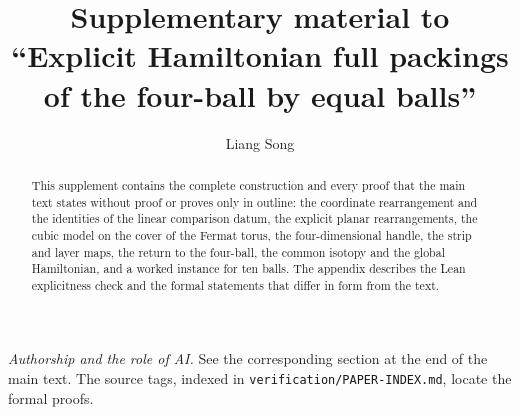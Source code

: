 \documentclass[11pt]{amsart}
\title[Supplement: Hamiltonian packings of the four-ball]{Supplementary material to\\
``Explicit Hamiltonian full packings of the four-ball by equal balls''}
\author{Liang Song}
\date{}
\begin{document}
\begin{abstract}
This supplement contains the complete construction and every proof that the main text states without proof or
proves only in outline: the coordinate rearrangement and the identities of the linear comparison datum, the explicit
planar rearrangements, the cubic model on the cover of the Fermat torus, the four-dimensional handle, the strip and
layer maps, the return to the four-ball, the common isotopy and the global Hamiltonian, and a worked instance for ten
balls. The appendix describes the Lean explicitness check and the formal statements that differ in form from the text.
\end{abstract}
\maketitle

\noindent\emph{Authorship and the role of AI.} See the corresponding section at the end of the main text.
The source tags, indexed in \texttt{verification/PAPER-INDEX.md}, locate the formal proofs.

\setcounter{tocdepth}{1}
\tableofcontents















\appendix




\end{document}
